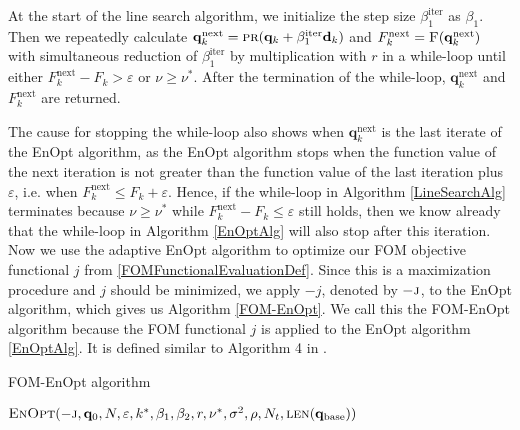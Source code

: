 At the start of the line search algorithm, we initialize the step size $\beta^\mathrm{iter}_1$ as $\beta_1$. Then we repeatedly calculate $\mathbf{q}^\mathrm{next}_k = \Call{pr}{\mathbf{q}_k+\beta^\mathrm{iter}_1\mathbf{d}_k}$ and $F^\mathrm{next}_k = \Call{F}{\mathbf{q}^\mathrm{next}_k}$ with simultaneous reduction of $\beta^\mathrm{iter}_1$ by multiplication with $r$ in a while-loop until either $F^\mathrm{next}_k-F_k>\varepsilon$ or $\nu\geq\nu^*$. After the termination of the while-loop, $\mathbf{q}^\mathrm{next}_k$ and $F^\mathrm{next}_k$ are returned.

The cause for stopping the while-loop also shows when $\mathbf{q}^\mathrm{next}_k$ is the last iterate of the EnOpt algorithm, as the EnOpt algorithm stops when the function value of the next iteration is not greater than the function value of the last iteration plus $\varepsilon$, i.e. when $F^\mathrm{next}_k\leq F_k+\varepsilon$. Hence, if the while-loop in Algorithm \ref{LineSearchAlg} terminates because $\nu\geq\nu^*$ while $F^\mathrm{next}_k-F_k\leq\varepsilon$ still holds, then we know already that the while-loop in Algorithm \ref{EnOptAlg} will also stop after this iteration.\\

Now we use the adaptive EnOpt algorithm to optimize our FOM objective functional $j$ from \eqref{FOMFunctionalEvaluationDef}. Since this is a maximization procedure and $j$ should be minimized, we apply $-j$, denoted by $-\textproc{j}$, to the EnOpt algorithm, which gives us Algorithm \ref{FOM-EnOpt}. We call this the FOM-EnOpt algorithm because the FOM functional $j$ is applied to the EnOpt algorithm \ref{EnOptAlg}. It is defined similar to Algorithm 4 in \cite{Keil2022-dj}.

\begin{algorithm}[H]%
\caption{\label{FOM-EnOpt}FOM-EnOpt algorithm}
\begin{algorithmic}[1]
\State \Return $\Call{EnOpt}{-\textproc{j},\mathbf{q}_0,N,\varepsilon,k^*,\beta_1,\beta_2,r,\nu^*,\sigma^2,\rho, N_t, \protect\Call{len}{\mathbf{q}_\mathrm{base}}}$
\EndFunction
\end{algorithmic}
\end{algorithm}

